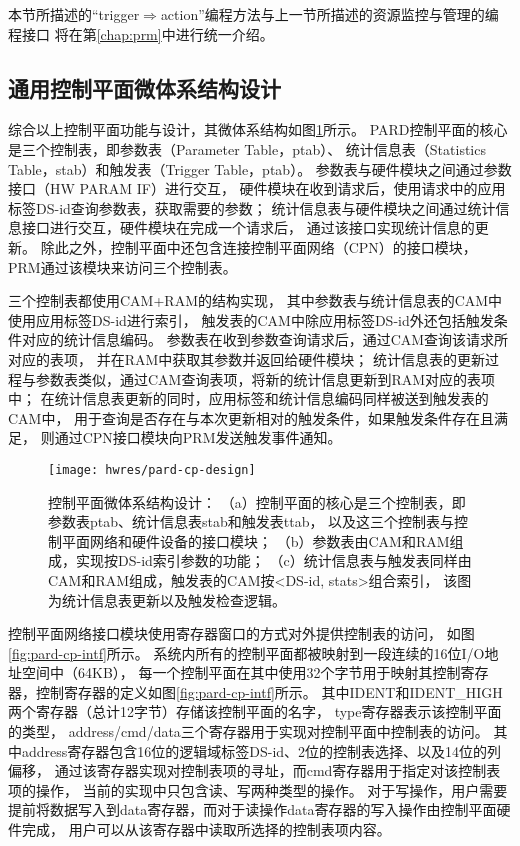 本节所描述的``trigger$\Rightarrow$action''编程方法与上一节所描述的资源监控与管理的编程接口
将在第\ref{chap:prm}中进行统一介绍。


\subsection{通用控制平面微体系结构设计}

综合以上控制平面功能与设计，其微体系结构如图\ref{fig:pard-cp-design}所示。
PARD控制平面的核心是三个控制表，即参数表（Parameter Table，ptab）、
统计信息表（Statistics Table，stab）和触发表（Trigger Table，ptab）。
参数表与硬件模块之间通过参数接口（HW PARAM IF）进行交互，
硬件模块在收到请求后，使用请求中的应用标签DS-id查询参数表，获取需要的参数；
统计信息表与硬件模块之间通过统计信息接口进行交互，硬件模块在完成一个请求后，
通过该接口实现统计信息的更新。
除此之外，控制平面中还包含连接控制平面网络（CPN）的接口模块，
PRM通过该模块来访问三个控制表。

三个控制表都使用CAM+RAM的结构实现，
其中参数表与统计信息表的CAM中使用应用标签DS-id进行索引，
触发表的CAM中除应用标签DS-id外还包括触发条件对应的统计信息编码。
参数表在收到参数查询请求后，通过CAM查询该请求所对应的表项，
并在RAM中获取其参数并返回给硬件模块；
统计信息表的更新过程与参数表类似，通过CAM查询表项，将新的统计信息更新到RAM对应的表项中；
在统计信息表更新的同时，应用标签和统计信息编码同样被送到触发表的CAM中，
用于查询是否存在与本次更新相对的触发条件，如果触发条件存在且满足，
则通过CPN接口模块向PRM发送触发事件通知。

\begin{figure}[tb]
  \centering
  \texttt{[image: hwres/pard-cp-design]}
  \caption[控制平面微体系结构设计]{控制平面微体系结构设计：
  （a）控制平面的核心是三个控制表，即参数表ptab、统计信息表stab和触发表ttab，
       以及这三个控制表与控制平面网络和硬件设备的接口模块；
  （b）参数表由CAM和RAM组成，实现按DS-id索引参数的功能；
  （c）统计信息表与触发表同样由CAM和RAM组成，触发表的CAM按<DS-id, stats>组合索引，
       该图为统计信息表更新以及触发检查逻辑。}
  \label{fig:pard-cp-design}
\end{figure}

控制平面网络接口模块使用寄存器窗口的方式对外提供控制表的访问，
如图\ref{fig:pard-cp-intf}所示。
系统内所有的控制平面都被映射到一段连续的16位I/O地址空间中（64KB），
每一个控制平面在其中使用32个字节用于映射其控制寄存器，控制寄存器的定义如图\ref{fig:pard-cp-intf}所示。
其中IDENT和IDENT\_HIGH两个寄存器（总计12字节）存储该控制平面的名字，
type寄存器表示该控制平面的类型，
address/cmd/data三个寄存器用于实现对控制平面中控制表的访问。
其中address寄存器包含16位的逻辑域标签DS-id、2位的控制表选择、以及14位的列偏移，
通过该寄存器实现对控制表项的寻址，而cmd寄存器用于指定对该控制表项的操作，
当前的实现中只包含读、写两种类型的操作。
对于写操作，用户需要提前将数据写入到data寄存器，而对于读操作data寄存器的写入操作由控制平面硬件完成，
用户可以从该寄存器中读取所选择的控制表项内容。

